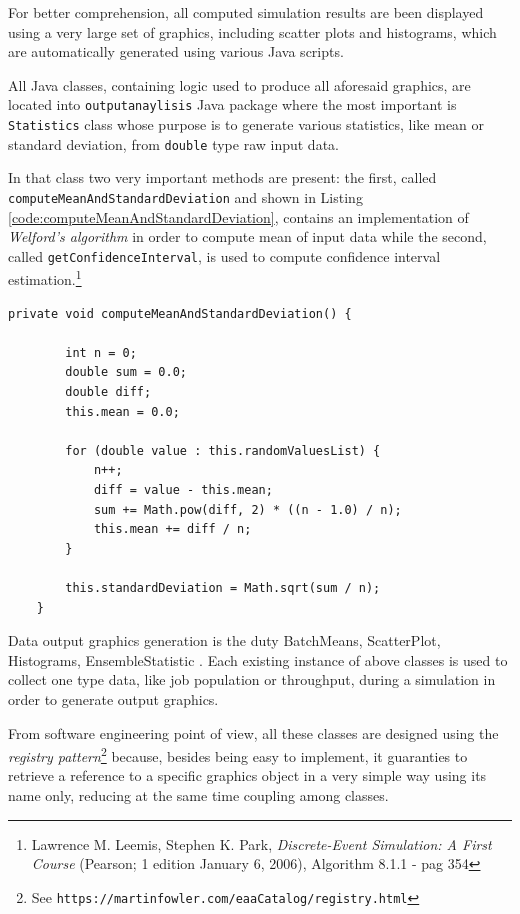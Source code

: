 \documentclass[10pt,a4paper]{article}
\begin{document}
For better comprehension, all computed simulation results are been displayed using a very large set of graphics, including scatter plots and histograms, which are automatically generated using various Java scripts.

All Java classes, containing logic used to produce all aforesaid graphics, are located into \texttt{outputanaylisis} Java package where the most important is \texttt{Statistics} class whose purpose is to generate various statistics, like mean or standard deviation, from \texttt{double} type raw input data. 

In that class two very important methods are present: the first, called \texttt{computeMeanAnd\-Stan\-dard\-Deviation} and shown in Listing \ref{code:computeMeanAndStandardDeviation}, contains an implementation of \textit{Welford’s algorithm} in order to compute mean of input data while the second, called \texttt{getConfidenceInterval}, is used to compute confidence interval estimation.\footnote{Lawrence M. Leemis, Stephen K. Park, \textit{Discrete-Event Simulation: A First Course} (Pearson; 1 edition January 6, 2006), Algorithm 8.1.1 - pag 354}

\begin{lstlisting}[frame=lines, caption={\texttt{computeMeanAndStandardDeviation} method implementation},label={code:computeMeanAndStandardDeviation}]
private void computeMeanAndStandardDeviation() {

        int n = 0;
        double sum = 0.0;
        double diff;
        this.mean = 0.0;

        for (double value : this.randomValuesList) {
            n++;
            diff = value - this.mean;
            sum += Math.pow(diff, 2) * ((n - 1.0) / n);
            this.mean += diff / n;
        }

        this.standardDeviation = Math.sqrt(sum / n);
    }
\end{lstlisting}

Data output graphics generation is the duty 
BatchMeans, ScatterPlot, Histograms, EnsembleStatistic . Each existing instance of above classes is used to collect one type data, like job population or throughput, during a simulation in order to generate output graphics.

From software engineering point of view, all these classes are designed using the \textit{registry pattern}\footnote{See \texttt{https://martinfowler.com/eaaCatalog/registry.html}} because, besides being easy to implement, it guaranties to retrieve a reference to a specific graphics object in a very simple way using its name only, reducing at the same time coupling among classes. 
\end{document}
